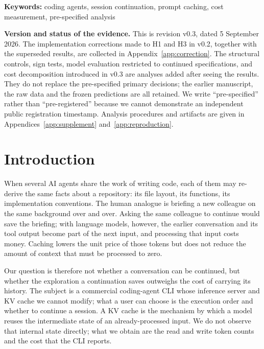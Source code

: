 \documentclass[a4paper,11pt]{article}
\begin{document}
\noindent\textbf{Keywords:} coding agents, session continuation, prompt caching, cost measurement, pre-specified analysis

\vspace{1em}
\noindent\textbf{Version and status of the evidence.}
This is revision v0.3, dated 5 September 2026. The implementation corrections made to H1 and H3 in v0.2, together with the superseded results, are collected in Appendix~\ref{app:correction}. The structural controls, sign tests, model evaluation restricted to continued specifications, and cost decomposition introduced in v0.3 are analyses added after seeing the results. They do not replace the pre-specified primary decisions; the earlier manuscript, the raw data and the frozen predictions are all retained. We write ``pre-specified'' rather than ``pre-registered'' because we cannot demonstrate an independent public registration timestamp. Analysis procedures and artifacts are given in Appendices~\ref{app:supplement} and~\ref{app:reproduction}.

\begingroup
\small\setlength{\parskip}{0pt}\renewcommand{\baselinestretch}{1.0}\selectfont
\tableofcontents
\endgroup
\clearpage

\section{Introduction}\label{sec:intro}
When several AI agents share the work of writing code, each of them may re-derive the same facts about a repository: its file layout, its functions, its implementation conventions. The human analogue is briefing a new colleague on the same background over and over. Asking the same colleague to continue would save the briefing; with language models, however, the earlier conversation and its tool output become part of the next input, and processing that input costs money. Caching lowers the unit price of those tokens but does not reduce the amount of context that must be processed to zero.

Our question is therefore not whether a conversation can be continued, but whether the exploration a continuation saves outweighs the cost of carrying its history. The subject is a commercial coding-agent CLI whose inference server and KV cache we cannot modify; what a user can choose is the execution order and whether to continue a session. A KV cache is the mechanism by which a model reuses the intermediate state of an already-processed input. We do not observe that internal state directly; what we obtain are the read and write token counts and the cost that the CLI reports.
\end{document}
